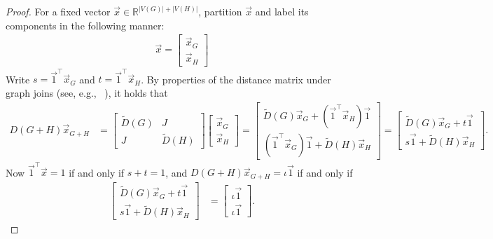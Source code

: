 \documentclass[11pt,a4paper]{article}
\newcommand{\distmatrix}{D}
\newcommand{\x}{\vec{x}}
\newcommand{\one}{\vec{1}}
\begin{document}
    \begin{proof}
        For a fixed vector $\x \in\mathbb{R}^{|V(G)|+|V(H)|}$, partition $\x$ and label its components in the following manner:
            \begin{align*}
                \x = \begin{bmatrix}
                    \x_G\\\x_H
                \end{bmatrix}
            \end{align*}
        Write $s = \one^\top\x_G$ and $t = \one^\top \x_H$. By properties of the distance matrix under graph joins (see, e.g., ~\cite{dudarov2023image,stevanovic2009distance}), it holds that
            \begin{align*}
                \distmatrix(G+ H)\x_{G+ H} &= \begin{bmatrix}
                    \widetilde{D}(G) & J\\
                    J & \widetilde{D}(H)
                \end{bmatrix}\begin{bmatrix}
                    \x_G\\\x_H
                \end{bmatrix} = \begin{bmatrix}
                    \widetilde{D}(G)\x_G + ( \one^\top\x_H)\one\\
                    ( \one^\top\x_G)\one + \widetilde{D}(H)\x_H
                \end{bmatrix} = \begin{bmatrix}
                    \widetilde{D}(G)\x_G + t\one\\
                    s\one + \widetilde{D}(H)\x_H
                \end{bmatrix}.
            \end{align*}
        Now $\one^\top \x = 1$ if and only if $s+t = 1$, and $\distmatrix(G+ H)\x_{G+ H} = \iota\one$ if and only if 
            \begin{align*}
                \begin{bmatrix}
                    \widetilde{D}(G)\x_G + t\one\\
                    s\one + \widetilde{D}(H)\x_H
                \end{bmatrix}&= \begin{bmatrix}
                    \iota\one\\
                    \iota\one
                \end{bmatrix}.

\end{align*}
\end{proof}
\end{document}
